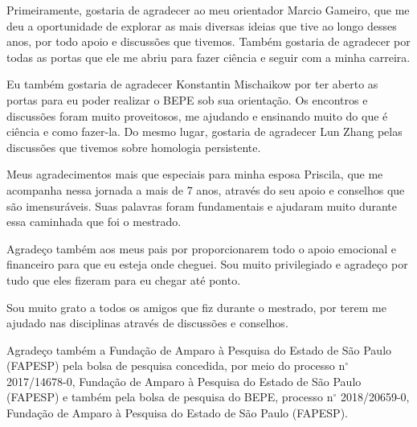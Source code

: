 
Primeiramente, gostaria de agradecer ao meu orientador Marcio Gameiro,
que me deu a oportunidade de explorar as mais diversas ideias que tive
ao longo desses anos, por todo apoio e discussões que tivemos. 
Também gostaria de agradecer por todas 
as portas que ele me abriu para fazer ciência e seguir com a minha carreira. 

Eu também gostaria de agradecer Konstantin Mischaikow por ter aberto
as portas para eu poder realizar o BEPE sob sua orientação. Os encontros
e discussões foram muito proveitosos, me ajudando e ensinando 
muito do que é ciência e como fazer-la. Do mesmo lugar, gostaria
de agradecer Lun Zhang pelas discussões que tivemos sobre homologia persistente. 

Meus agradecimentos mais que especiais para minha esposa Priscila,
que me acompanha nessa jornada a mais de 7 anos, através do seu apoio
e conselhos que são imensuráveis. Suas palavras foram 
fundamentais e ajudaram muito durante essa caminhada que foi o mestrado. 

Agradeço também aos meus pais por proporcionarem todo o apoio emocional
e financeiro para que eu esteja onde cheguei. Sou muito privilegiado
e agradeço por tudo que eles fizeram para eu chegar até ponto. 

Sou muito grato a todos os amigos que fiz durante o mestrado, por terem 
me ajudado nas disciplinas através de discussões e conselhos.

Agradeço também a Fundação de Amparo à Pesquisa do Estado de São Paulo (FAPESP)
pela bolsa de pesquisa concedida, por meio do processo n$^\circ$ 2017/14678-0,
Fundação de Amparo à Pesquisa do Estado de São Paulo (FAPESP) e também
pela bolsa de pesquisa do BEPE, processo n$^\circ$ 2018/20659-0, Fundação de Amparo à Pesquisa 
do Estado de São Paulo (FAPESP).
